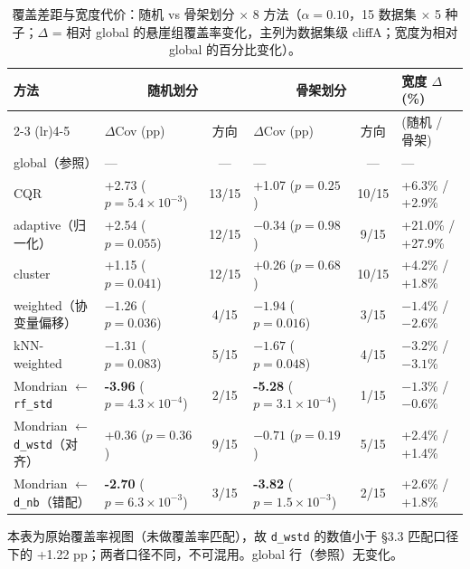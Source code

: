 \documentclass[UTF8, 11pt, a4paper]{ctexart}
\newcommand{\sig}[1]{\texttt{#1}}
\begin{document}
\begin{table}[htbp]
  \centering
  \caption{覆盖差距与宽度代价：随机 vs 骨架划分 $\times$ 8 方法（$\alpha = 0.10$，15 数据集 $\times$ 5 种子；$\Delta$ = 相对 global 的悬崖组覆盖率变化，主列为数据集级 cliffA；宽度为相对 global 的百分比变化）。}
  \label{tab:methods}
  \begin{threeparttable}
  \begin{tabularx}{\textwidth}{@{} l X c X c l @{}}
    \toprule
    方法 & \multicolumn{2}{c}{随机划分} & \multicolumn{2}{c}{骨架划分} & 宽度 $\Delta$(\%) \\
    \cmidrule(lr){2-3} \cmidrule(lr){4-5}
    & $\Delta$Cov (pp) & 方向 & $\Delta$Cov (pp) & 方向 & (随机 / 骨架) \\
    \midrule
    global（参照） & — & — & — & — & — \\
    CQR                         & +2.73 ($p=5.4\times10^{-3}$) & 13/15 & +1.07 ($p=0.25$) & 10/15 & +6.3\% / +2.9\% \\
    adaptive（归一化）          & +2.54 ($p=0.055$) & 12/15 & $-0.34$ ($p=0.98$) & 9/15 & +21.0\% / +27.9\% \\
    cluster                     & +1.15 ($p=0.041$) & 12/15 & +0.26 ($p=0.68$) & 10/15 & +4.2\% / +1.8\% \\
    weighted（协变量偏移）      & $-1.26$ ($p=0.036$) & 4/15 & $-1.94$ ($p=0.016$) & 3/15 & $-1.4$\% / $-2.6$\% \\
    kNN-weighted                & $-1.31$ ($p=0.083$) & 5/15 & $-1.67$ ($p=0.048$) & 4/15 & $-3.2$\% / $-3.1$\% \\
    Mondrian $\leftarrow$ \sig{rf\_std} & {\bfseries -3.96} ($p=4.3\times10^{-4}$) & 2/15 & {\bfseries -5.28} ($p=3.1\times10^{-4}$) & 1/15 & $-1.3$\% / $-0.6$\% \\
    Mondrian $\leftarrow$ \sig{d\_wstd}（对齐） & +0.36 ($p=0.36$) & 9/15 & $-0.71$ ($p=0.19$) & 5/15 & +2.4\% / +1.4\% \\
    Mondrian $\leftarrow$ \sig{d\_nb}（错配）   & {\bfseries -2.70} ($p=6.3\times10^{-3}$) & 3/15 & {\bfseries -3.82} ($p=1.5\times10^{-3}$) & 2/15 & +2.6\% / +1.8\% \\
    \bottomrule
  \end{tabularx}
  \begin{tablenotes}\footnotesize
    \item[注] 本表为原始覆盖率视图（未做覆盖率匹配），故 \sig{d\_wstd} 的数值小于 §3.3 匹配口径下的 +1.22 pp；两者口径不同，不可混用。global 行（参照）无变化。
  \end{tablenotes}
  \end{threeparttable}
\end{table}
\end{document}
